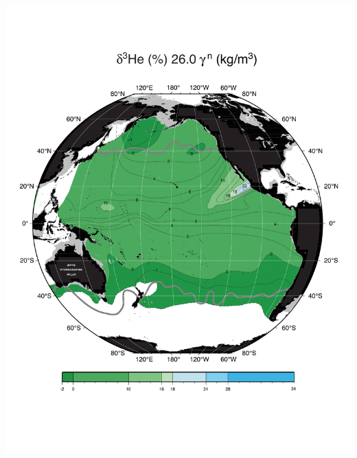 \documentclass{beamer}
\begin{document}
\begin{frame}[plain,t]
\begin{columns}
\begin{column}{0.33\textwidth}
        \includegraphics[width=\textwidth]{delhe3_isopyc_final_pdf/pac2600_delhe3_final.pdf}
      \end{column}
    \end{columns} 
\end{frame}
\end{document}
